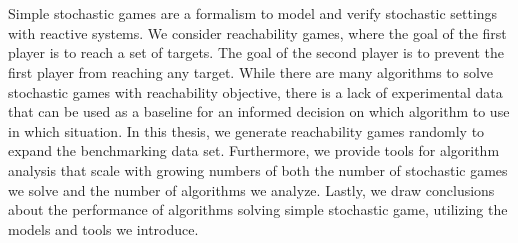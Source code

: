 \chapter*{\abstractname}
Simple stochastic games are a formalism to model and verify stochastic settings with reactive systems.
We consider reachability games, where the goal of the first player is to reach a set of targets.
The goal of the second player is to prevent the first player from reaching any target.
While there are many algorithms to solve stochastic games with reachability objective, 
there is a lack of experimental data that can be used as a baseline for an informed decision on which algorithm to use in which situation.
In this thesis, we generate reachability games randomly to expand the benchmarking data set.
Furthermore, we provide tools for algorithm analysis that scale
with growing numbers of both the number of stochastic games we solve and the number of algorithms we analyze.
Lastly, we draw conclusions about the performance of algorithms solving simple stochastic game, utilizing the models and tools we introduce.